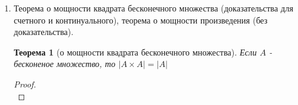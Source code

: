 \documentclass[a4paper]{article}
\newtheorem*{theorem*}{Теорема}
\newtheorem*{lemma*}{Лемма}
\theoremstyle{definition}
\begin{document}
\begin{enumerate}
\begin{proof}
\begin{enumerate}
               $h_{1}(<x;y>)=<f(x),g(y)>$.
                Легко проверить, что $h_{1}$ - нужная биекция.
         \item Построим $h_{2} : A\cup B \xrightarrow[\text{на}]{1-1}A_{1}\cup B_{1}$ так:
               $h_{2}(x) =
                \left\{
                \begin{matrix}
                 f(x)\text{, если} x \in A \\
                 g(x)\text{, если} x \in B \\
                \end{matrix}
                \right.$
               Условие $A \cap B = \emptyset$ гарантирует, что определение корректно.
               Вновь нетрудно доказать, что $h_{2}$ - биекция. Проверим в качестве примера, что $h_{2}$ инъективна. Пусть $h_{2}(x)=h_{2}(y)$. Если $x,y \in A$, то получаем $f(x)=f(y)$ и $x=y$. Если $x,y \in B$, рассуждения аналогичны. Если же $x \in A, y \in B$  (или наоборот), то $h_{2}(x) \in A_{1}$ и $h_{2}(y) \in B_{1}$, что невозможно в силу $A_{1} \cap B_{2} = \emptyset$.
        \end{enumerate}
       \end{proof}
       \begin{lemma*}[о мощности объединения] Если хотя бы одно из множеств $A,B$ бесконечно, то $\left | A \cup B \right | = max\{\left | A \right |,\left | B \right |\}$.
       \end{lemma*}
 \item Теорема о мощности квадрата бесконечного множества (доказательства для счетного и континуального), теорема о мощности произведения (без доказательства).
       \begin{theorem*}[о мощности квадрата бесконечного множества]
        Если $A$ - бесконеное множество, то $|A\times{A}|=|A|$
       \end{theorem*}
       \begin{proof}\mbox{}\\
\end{proof}
\end{enumerate}
\end{document}

